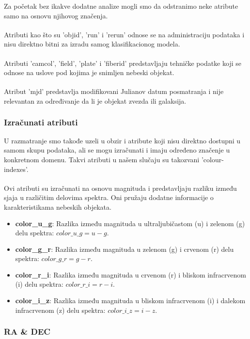 \documentclass[a4paper,12pt]{article}
\begin{document}
Za početak bez ikakve dodatne analize mogli smo da odstranimo neke atribute samo na osnovu njihovog značenja.
\\\\Atributi kao što su 'objid', 'run' i 'rerun' odnose se na administraciju podataka i nisu direktno bitni za izradu samog klasifikacionog modela.
\\\\Atributi 'camcol', 'field', 'plate' i 'fiberid' predstavljaju tehničke podatke koji se odnose na uslove pod kojima je snimljen nebeski objekat.
\\\\Atribut 'mjd' predstavlja modifikovani Julianov datum posmatranja i nije relevantan za određivanje da li je objekat zvezda ili galaksija.

\subsubsection{Izračunati atributi}

U razmatranje smo takođe uzeli u obzir i atribute koji nisu direktno dostupni u samom skupu podataka, ali se mogu izračunati i imaju određeno značenje u konkretnom domenu. Takvi atributi u našem slučaju su takozvani 'colour-indexes'.
\\\\Ovi atributi su izračunati na osnovu magnituda i predstavljaju razliku između sjaja u različitim delovima spektra. Oni pružaju dodatne informacije o karakteristikama nebeskih objekata.
        \begin{itemize}
            \item \textbf{color\_u\_g}: Razlika između magnituda u ultraljubičastom (u) i zelenom (g) delu spektra: $color\_u\_g = u - g$.
            \item \textbf{color\_g\_r}: Razlika između magnituda u zelenom (g) i crvenom (r) delu spektra: $color\_g\_r = g - r$.
            \item \textbf{color\_r\_i}: Razlika između magnituda u crvenom (r) i bliskom infracrvenom (i) delu spektra: $color\_r\_i = r - i$.
            \item \textbf{color\_i\_z}: Razlika između magnituda u bliskom infracrvenom (i) i dalekom infracrvenom (z) delu spektra: $color\_i\_z = i - z$.
        \end{itemize}

\subsubsection{RA & DEC}
\end{document}

